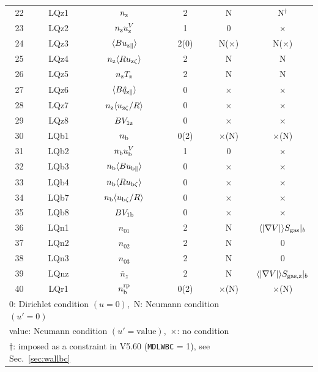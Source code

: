 \documentclass[11pt]{article}
\def\r#1{{\rm#1}}
\def\aves#1{\langle#1\rangle}
\def\para{\parallel}
\def\nz{n_\r{z}}
\def\nb{n_\r{b}}
\def\Tz{T_\r{z}}
\def\uzt#1{u_{\r{#1}\zeta}}
\def\upara#1{u_{\r{#1}\para}}
\def\qhatpara#1{\hat{q}_{\r{#1}\para}}
\def\uV#1{u_\r{#1}^V}
\def\nbrp{n_\r{b}^\r{rp}}
\def\nna{n_{01}}
\def\nnb{n_{02}}
\def\nnc{n_{03}}
\def\nnz{\bar{n}_{z}}
\begin{document}
\begin{tabular}{|c|c|c|c|c|c|}
 22   & LQz1 & $\nz$                  & 2    &  N           & N$^\dagger$\\
 23   & LQz2 & $\nz\uV{z}$            & 1    &  0           & $\times$\\
 24   & LQz3 & $\aves{B\upara{z}}$    & 2(0) &  N($\times$) & N($\times$)\\
 25   & LQz4 & $\nz\aves{R\uzt{z}}$   & 2    &  N           & N\\
 26   & LQz5 & $\nz \Tz$              & 2    &  N           & N\\
 27   & LQz6 & $\aves{B\qhatpara{z}}$ & 0    &  $\times$    & $\times$\\
 28   & LQz7 & $\nz\aves{\uzt{z}/R}$  & 0    &  $\times$    & $\times$\\
 29   & LQz8 & $B V_{1\r{z}}$         & 0    &  $\times$    & $\times$\\
 30   & LQb1 & $\nb$                  & 0(2) &  $\times$(N) & $\times$(N)\\
 31   & LQb2 & $\nb\uV{b}$            & 1    &  0           & $\times$\\
 32   & LQb3 & $\nb\aves{B\upara{b}}$ & 0    &  $\times$    & $\times$\\
 33   & LQb4 & $\nb\aves{R\uzt{b}}$   & 0    &  $\times$    & $\times$\\
 34   & LQb7 & $\nb\aves{\uzt{b}/R}$  & 0    &  $\times$    & $\times$\\
 35   & LQb8 & $B V_{1\r{b}}$         & 0    &  $\times$    & $\times$\\
 36   & LQn1 & $\nna$                 & 2    &  N           & $\aves{|\nabla V|}S_\r{gas}|_b$\\
 37   & LQn2 & $\nnb$                 & 2    &  N           & 0\\
 38   & LQn3 & $\nnc$                 & 2    &  N           & 0\\
 39   & LQnz & $\nnz$                 & 2    &  N           & $\aves{|\nabla V|}S_\r{gas,z}|_b$\\
 40   & LQr1 & $\nbrp$                & 0(2) &  $\times$(N) & $\times$(N)\\\hline
 \multicolumn{5}{l}{0: Dirichlet condition $(u=0)$,\ 
                    N: Neumann condition $(u'=0)$}\\
 \multicolumn{5}{l}{value: Neumann condition $(u'=\mbox{value})$,\ 
                    $\times$: no condition}\\
 \multicolumn{5}{l}{$\dagger$: imposed as a constraint in V5.60 (\texttt{MDLWBC} = 1), see Sec.~\ref{sec:wallbc}}
\end{tabular}
%
\end{document}
